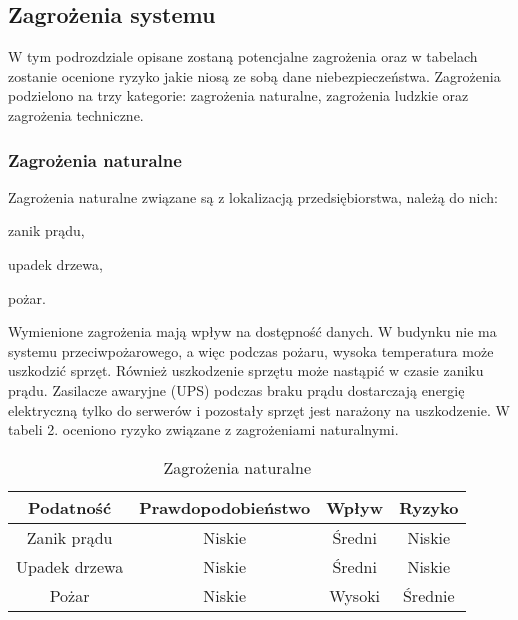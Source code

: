 \subsection{Zagrożenia systemu}
W tym podrozdziale opisane zostaną potencjalne zagrożenia oraz w tabelach zostanie ocenione ryzyko jakie niosą ze sobą dane niebezpieczeństwa. Zagrożenia podzielono na trzy kategorie: zagrożenia naturalne, zagrożenia ludzkie oraz zagrożenia techniczne.

\subsubsection{Zagrożenia naturalne} 
Zagrożenia naturalne związane są z lokalizacją przedsiębiorstwa, należą do nich:
\begin{itemize*}
	\item zanik prądu,
	\item upadek drzewa,
	\item pożar.
\end{itemize*}

Wymienione zagrożenia mają wpływ na dostępność danych. W budynku nie ma systemu przeciwpożarowego, a więc podczas pożaru, wysoka temperatura może uszkodzić sprzęt. Również uszkodzenie sprzętu może nastąpić w czasie zaniku prądu. Zasilacze awaryjne (UPS) podczas braku prądu dostarczają energię elektryczną tylko do serwerów i pozostały sprzęt jest narażony na uszkodzenie. W tabeli 2. oceniono ryzyko związane z zagrożeniami naturalnymi.
\begin{table}[!ht]
	\centering
	\caption{Zagrożenia naturalne}
	\label{zagrożeniaNaturalne}
	\begin{tabular}{|c|c|c|c|}
		\hline
		\textbf{Podatność} & \textbf{Prawdopodobieństwo} & \textbf{Wpływ} & \textbf{Ryzyko} \\ \hline
		Zanik prądu        & Niskie                      & Średni         & Niskie          \\ \hline
		Upadek drzewa      & Niskie                      & Średni         & Niskie          \\ \hline
		Pożar              & Niskie                      & Wysoki        & Średnie         \\ \hline
	\end{tabular}
\end{table}

